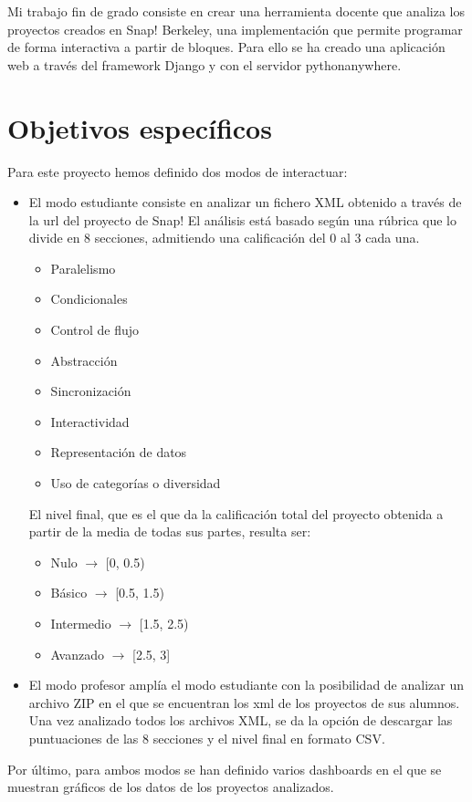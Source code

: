 \documentclass[a4paper, 12pt]{book}
\begin{document}
Mi trabajo fin de grado consiste en crear  una herramienta docente que analiza los proyectos creados en Snap! Berkeley, una implementación que permite programar de forma interactiva a partir de bloques. Para ello se ha creado una aplicación web a través del framework Django y con el servidor pythonanywhere.

\section{Objetivos específicos}
\label{sec:objetivos-especificos}

Para este proyecto hemos definido dos modos de interactuar:
\begin{itemize}
\item 
El modo estudiante  consiste en  analizar un fichero XML obtenido a través de la url del proyecto de Snap! El análisis está basado según una rúbrica  que lo divide en 8 secciones, admitiendo una calificación del 0 al 3 cada una.
\begin{itemize}
      \item
     Paralelismo
      \item
     Condicionales
      \item
      Control de flujo
      \item
      Abstracción
      \item
      Sincronización
      \item
      Interactividad
      \item
      Representación de datos
      \item
      Uso de categorías o diversidad
    \end{itemize}
El nivel final, que es el que da la calificación total del proyecto obtenida a partir de la media de todas sus partes, resulta ser:
    \begin{itemize}
          \item
          Nulo $\rightarrow $ [0, 0.5)
          \item
          Básico $\rightarrow $ [0.5, 1.5)
          \item
          Intermedio $\rightarrow $ [1.5, 2.5)
          \item
          Avanzado $\rightarrow $ [2.5, 3]
     \end{itemize}
\item
El modo profesor amplía el modo estudiante con la posibilidad de analizar un archivo ZIP en el que se encuentran los xml de los proyectos de sus alumnos. Una vez analizado todos los archivos XML, se da la opción de descargar las puntuaciones  de las 8 secciones y el nivel final en formato CSV.

\end{itemize}
Por último, para ambos modos se han definido varios dashboards en el que se muestran gráficos de los datos de los proyectos analizados.
\end{document}
